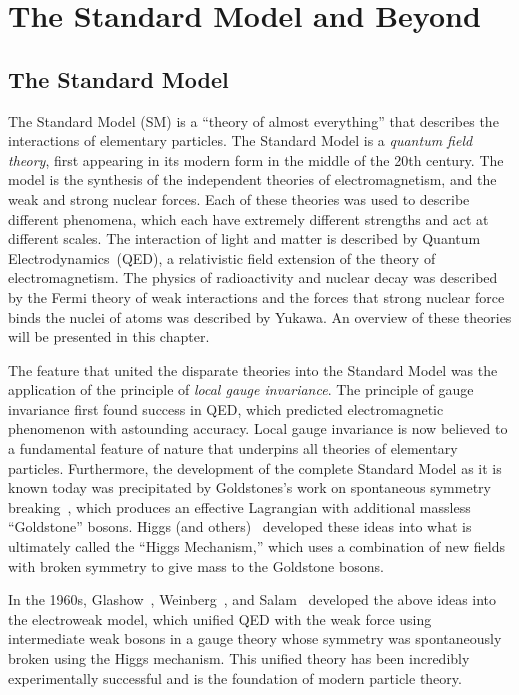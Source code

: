 \ifx\master\undefined\fi

\chapter{The Standard Model and Beyond}
\label{ch:theory}

\section{The Standard Model}
%
The Standard Model (SM) is a ``theory of almost everything'' that describes the
interactions of elementary particles.  The Standard Model is a \emph{quantum
field theory}, first appearing in its modern form in the middle of the 20th
century.  The model is the synthesis of the independent theories of
electromagnetism, and the weak and strong nuclear forces.  Each of these
theories was used to describe different phenomena, which each have extremely
different strengths and act at different scales.  The interaction of light and
matter is described by Quantum Electrodynamics~(QED), a relativistic field
extension of the theory of electromagnetism.  The physics of radioactivity and
nuclear decay was described by the Fermi theory of weak interactions and the
forces that strong nuclear force binds the nuclei of atoms was described by
Yukawa.  An overview of these theories will be presented in this chapter.  

The feature that united the disparate theories into the Standard Model was the
application of the principle of \emph{local gauge invariance}. The principle of
gauge invariance first found success in QED, which predicted electromagnetic
phenomenon with astounding accuracy.  Local gauge invariance is now believed to
a fundamental feature of nature that underpins all theories of elementary
particles.  Furthermore, the development of the complete Standard Model as it is
known today was precipitated by Goldstones's work on spontaneous symmetry
breaking~\cite{Goldstone:1961eq,PhysRev.127.965}, which produces an effective
Lagrangian with additional massless ``Goldstone'' bosons.  Higgs (and
others)~\cite{PhysRevLett.13.321, PhysRevLett.13.508,PhysRevLett.13.585}
developed these ideas into what is ultimately called the ``Higgs Mechanism,''
which uses a combination of new fields with broken symmetry to give mass to the
Goldstone bosons.

In the 1960s, Glashow~\cite{Glashow:1961tr}, Weinberg~\cite{Weinberg:1967tq}, 
and Salam~\cite{Salam:1968rm} developed the above ideas into the
electroweak model, which unified QED with the weak force using intermediate weak
bosons in a gauge theory whose symmetry was spontaneously broken using the Higgs
mechanism.  This unified theory has been incredibly experimentally successful
and is the foundation of modern particle theory.

